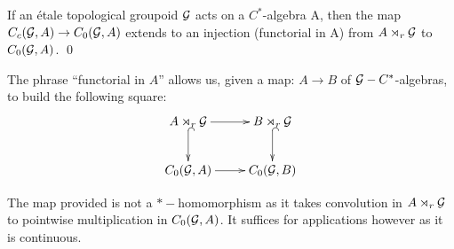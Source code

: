\begin{lemma}\label{Lem:Lemma9}
If an \'etale topological groupoid $\mathcal{G}$ acts on a $C^{*}$-algebra A, then the map $C_{c}(\mathcal{G},A) \rightarrow C_{0}(\mathcal{G},A)$ extends to an injection (functorial in A) from $A\rtimes_{r} \mathcal{G}$ to $C_{0}(\mathcal{G},A)$. \qed
\end{lemma}

\begin{remark}
The phrase ``functorial in $A$'' allows us, given a map: $A \rightarrow B$ of $\mathcal{G}-C^{*}$-algebras, to build the following square:
\begin{equation*}
\xymatrix{A\rtimes_{r} \G \ar@{->}[r] \ar@{^{(}->}[d] &B \rtimes_{r} \G \ar@{^{(}->}[d]\\
C_{0}(\G ,A)\ar@{->}[r] &   C_{0}(\G ,B)
}
\end{equation*}
\end{remark}

\begin{remark}
The map provided is not a $*-$homomorphism as it takes convolution in $A\rtimes_{r} \mathcal{G}$ to pointwise multiplication in $C_{0}(\mathcal{G},A)$. It suffices for applications however as it is continuous.
\end{remark}

